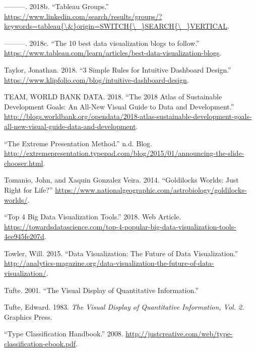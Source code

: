 \documentclass[]{book}
\begin{document}
\leavevmode\hypertarget{ref-LinkedIn_Groups}{}%
---------. 2018b. ``Tableau Groups.'' \href{https://www.linkedin.com/search/results/groups/?keywords=tableau\%7B/\&\%7Dorigin=SWITCH\%7B/_\%7DSEARCH\%7B/_\%7DVERTICAL}{https://www.linkedin.com/search/results/groups/?keywords=tableau\{\textbackslash{}\&\}origin=SWITCH\{\textbackslash{}\_\}SEARCH\{\textbackslash{}\_\}VERTICAL}.

\leavevmode\hypertarget{ref-Top_10_Blogs}{}%
---------. 2018c. ``The 10 best data visualization blogs to follow.'' \url{https://www.tableau.com/learn/articles/best-data-visualization-blogs}.

\leavevmode\hypertarget{ref-intuitive_dash}{}%
Taylor, Jonathan. 2018. ``3 Simple Rules for Intuitive Dashboard Design.'' \url{https://www.klipfolio.com/blog/intuitive-dashboard-design}.

\leavevmode\hypertarget{ref-world_bank_data}{}%
TEAM, WORLD BANK DATA. 2018. ``The 2018 Atlas of Sustainable Development Goals: An All-New Visual Guide to Data and Development.'' \url{http://blogs.worldbank.org/opendata/2018-atlas-sustainable-development-goals-all-new-visual-guide-data-and-development}.

\leavevmode\hypertarget{ref-extremepre}{}%
``The Extreme Presentation Method.'' n.d. Blog. \url{http://extremepresentation.typepad.com/blog/2015/01/announcing-the-slide-chooser.html}.

\leavevmode\hypertarget{ref-goldilocks_worlds}{}%
Tomanio, John, and Xaquin Gonzalez Veira. 2014. ``Goldilocks Worlds: Just Right for Life?'' \url{https://www.nationalgeographic.com/astrobiology/goldilocks-worlds/}.

\leavevmode\hypertarget{ref-top4_viz_tools}{}%
``Top 4 Big Data Visualization Tools.'' 2018. Web Article. \url{https://towardsdatascience.com/top-4-popular-big-data-visualization-tools-4ee945fe207d}.

\leavevmode\hypertarget{ref-future_viz}{}%
Towler, Will. 2015. ``Data Visualization: The Future of Data Visualization.'' \url{http://analytics-magazine.org/data-visualization-the-future-of-data-visualization/}.

\leavevmode\hypertarget{ref-Tufte_2001}{}%
Tufte. 2001. ``The Visual Display of Quantitative Information.''

\leavevmode\hypertarget{ref-visual_display}{}%
Tufte, Edward. 1983. \emph{The Visual Display of Quantitative Information, Vol. 2.} Graphics Press.

\leavevmode\hypertarget{ref-type_class}{}%
``Type Classification Handbook.'' 2008. \url{http://justcreative.com/web/type-classification-ebook.pdf}.
\end{document}

